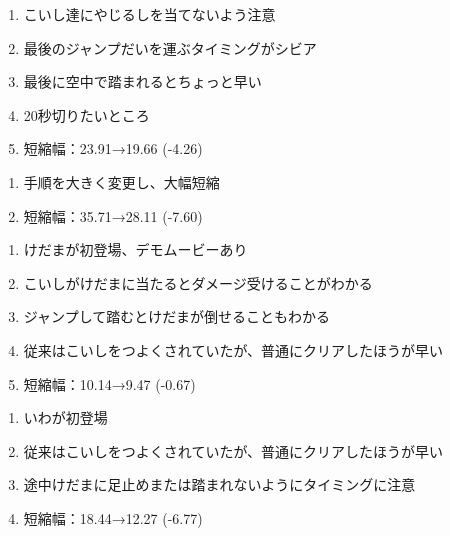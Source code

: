 \begin{enumerate}[label={\sarrow}]
\item こいし達にやじるしを当てないよう注意
\item 最後のジャンプだいを運ぶタイミングがシビア
\item 最後に空中で踏まれるとちょっと早い
\item 20秒切りたいところ
\item 短縮幅：23.91→19.66 (-4.26)
\end{enumerate}



\begin{enumerate}[label={\sarrow}]
\item 手順を大きく変更し、大幅短縮
\item 短縮幅：35.71→28.11 (-7.60)
\end{enumerate}



\begin{enumerate}[label={\sarrow}]
\item けだまが初登場、デモムービーあり
\item こいしがけだまに当たるとダメージ受けることがわかる
\item ジャンプして踏むとけだまが倒せることもわかる
\item 従来はこいしをつよくされていたが、普通にクリアしたほうが早い
\item 短縮幅：10.14→9.47 (-0.67)
\end{enumerate}



\clearpage
\begin{enumerate}[label={\sarrow}]
\item いわが初登場
\item 従来はこいしをつよくされていたが、普通にクリアしたほうが早い
\item 途中けだまに足止めまたは踏まれないようにタイミングに注意
\item 短縮幅：18.44→12.27 (-6.77)
\end{enumerate}



